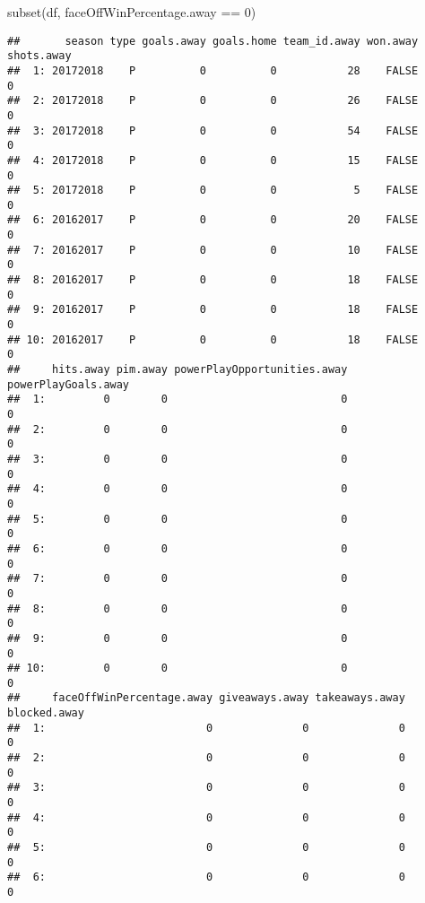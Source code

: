 \documentclass[
]{article}
\newenvironment{Shaded}{\begin{snugshade}}{\end{snugshade}}
\newcommand{\DecValTok}[1]{\textcolor[rgb]{0.00,0.00,0.81}{#1}}
\newcommand{\FunctionTok}[1]{\textcolor[rgb]{0.00,0.00,0.00}{#1}}
\newcommand{\NormalTok}[1]{#1}
\newcommand{\SpecialCharTok}[1]{\textcolor[rgb]{0.00,0.00,0.00}{#1}}
\begin{document}
\begin{Shaded}
\begin{Highlighting}[]
\FunctionTok{subset}\NormalTok{(df, faceOffWinPercentage.away }\SpecialCharTok{==} \DecValTok{0}\NormalTok{)}
\end{Highlighting}
\end{Shaded}

\begin{verbatim}
##       season type goals.away goals.home team_id.away won.away shots.away
##  1: 20172018    P          0          0           28    FALSE          0
##  2: 20172018    P          0          0           26    FALSE          0
##  3: 20172018    P          0          0           54    FALSE          0
##  4: 20172018    P          0          0           15    FALSE          0
##  5: 20172018    P          0          0            5    FALSE          0
##  6: 20162017    P          0          0           20    FALSE          0
##  7: 20162017    P          0          0           10    FALSE          0
##  8: 20162017    P          0          0           18    FALSE          0
##  9: 20162017    P          0          0           18    FALSE          0
## 10: 20162017    P          0          0           18    FALSE          0
##     hits.away pim.away powerPlayOpportunities.away powerPlayGoals.away
##  1:         0        0                           0                   0
##  2:         0        0                           0                   0
##  3:         0        0                           0                   0
##  4:         0        0                           0                   0
##  5:         0        0                           0                   0
##  6:         0        0                           0                   0
##  7:         0        0                           0                   0
##  8:         0        0                           0                   0
##  9:         0        0                           0                   0
## 10:         0        0                           0                   0
##     faceOffWinPercentage.away giveaways.away takeaways.away blocked.away
##  1:                         0              0              0            0
##  2:                         0              0              0            0
##  3:                         0              0              0            0
##  4:                         0              0              0            0
##  5:                         0              0              0            0
##  6:                         0              0              0            0

\end{verbatim}
\end{document}
